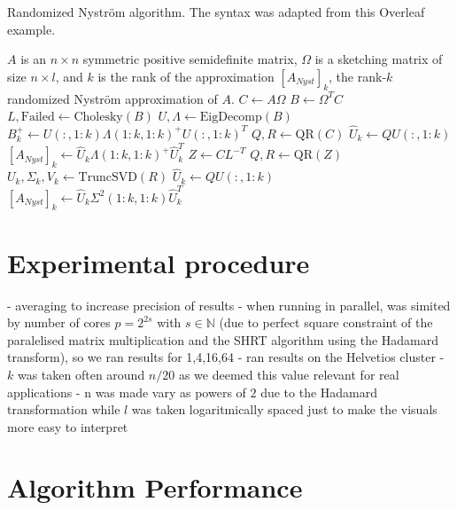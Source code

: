 \documentclass[a4paper, 12pt,oneside]{article}
\begin{document}
	\begin{algorithm}
		\caption{Randomized Nystr\"om algorithm. The syntax was adapted from this Overleaf example.}\label{alg:parallel-rand-nystrom}
		\begin{algorithmic}
		\Require $A$ is an $n\times n$ symmetric positive semidefinite matrix, $\Omega$ is a sketching matrix of size $n\times l$, and $k$ is the rank of the approximation
		\Ensure $[A_{N y s t}]_k$, the rank-$k$ randomized Nystr\"om approximation of $A$. 
		\State $C \gets A \Omega$
		\State $B \gets \Omega^T C$
		\State $L, \text{Failed} \gets \text{Cholesky}(B)$ 
			\State $U, \Lambda \gets \text{EigDecomp}(B)$ 
			\State $B_k^{+} \gets U(:,1:k) \Lambda(1: k, 1: k)^{+} U(:, 1: k)^T$
			\State $Q, R \gets \text{QR}(C)$ 
			\State $\hat{U}_k \gets Q U(:, 1:k)$ 
			\State $[A_{N y s t}]_k \gets \hat{U}_k \Lambda(1: k, 1: k)^{+} \hat{U}_k^T$ 
		\Else{}
			\State $Z \gets C L^{-T}$ 
			\State $Q, R \gets \text{QR}(Z)$ 
			\State $U_k, \Sigma_k, V_k \gets \text{TruncSVD}(R)$
			\State $\hat{U}_k \gets Q U(:, 1:k)$ 
			\State $[A_{N y s t}]_k \gets \hat{U}_k \Sigma^2(1: k, 1: k) \hat{U}_k^T$ 
		\EndIf
		\end{algorithmic}
	\end{algorithm}
	
	\section{Experimental procedure}
		- averaging to increase precision of results
		- when running in parallel, was simited by number of cores $p=2^{2s}$ with $s\in\mathbb{N}$ (due to perfect square constraint of the paralelised matrix multiplication and the SHRT algorithm using the Hadamard transform), so we ran results for 1,4,16,64
		- ran results on the Helvetios cluster 
		- $k$ was taken often around $n/20$ as we deemed this value relevant for real applications
		- n was made vary as powers of $2$ due to the Hadamard transformation while $l$ was taken logaritmically spaced just to make the visuals more easy to interpret  
	\section{Algorithm Performance}
\end{document}
